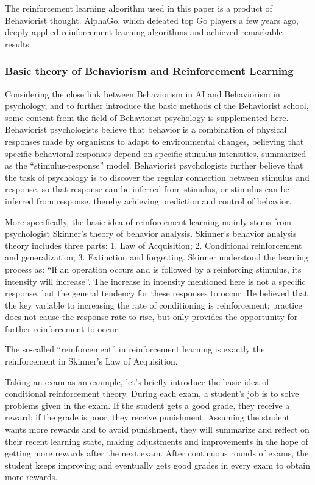\documentclass{article}
\begin{document}
The reinforcement learning algorithm used in this paper is a product of Behaviorist thought.
AlphaGo, which defeated top Go players a few years ago, deeply applied reinforcement learning algorithms and achieved remarkable results.

\subsubsection{Basic theory of Behaviorism and Reinforcement Learning}\indent

Considering the close link between Behaviorism in AI and Behaviorism in psychology, and to further introduce the basic methods of the Behaviorist school, some content from the field of Behaviorist psychology is supplemented here.
Behaviorist psychologists believe that behavior is a combination of physical responses made by organisms to adapt to environmental changes, believing that specific behavioral responses depend on specific stimulus intensities, summarized as the ``stimulus-response'' model.
Behaviorist psychologists further believe that the task of psychology is to discover the regular connection between stimulus and response, so that response can be inferred from stimulus, or stimulus can be inferred from response, thereby achieving prediction and control of behavior.

More specifically, the basic idea of reinforcement learning mainly stems from psychologist Skinner's theory of behavior analysis.
Skinner's behavior analysis theory includes three parts:
1. Law of Acquisition; 2. Conditional reinforcement and generalization; 3. Extinction and forgetting.
Skinner understood the learning process as: ``If an operation occurs and is followed by a reinforcing stimulus, its intensity will increase''.
The increase in intensity mentioned here is not a specific response, but the general tendency for these responses to occur.
He believed that the key variable to increasing the rate of conditioning is reinforcement; practice does not cause the response rate to rise, but only provides the opportunity for further reinforcement to occur.

The so-called ``reinforcement'' in reinforcement learning is exactly the reinforcement in Skinner's Law of Acquisition.

Taking an exam as an example, let's briefly introduce the basic idea of conditional reinforcement theory.
During each exam, a student's job is to solve problems given in the exam.
If the student gets a good grade, they receive a reward; if the grade is poor, they receive punishment.
Assuming the student wants more rewards and to avoid punishment, they will summarize and reflect on their recent learning state, making adjustments and improvements in the hope of getting more rewards after the next exam.
After continuous rounds of exams, the student keeps improving and eventually gets good grades in every exam to obtain more rewards.
\end{document}
